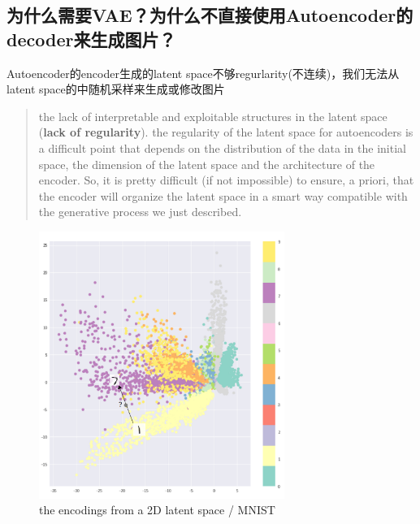 \subsection{为什么需要VAE？为什么不直接使用Autoencoder的decoder来生成图片？}

Autoencoder的encoder生成的latent space不够regurlarity(不连续)，我们无法从latent space的中随机采样来生成或修改图片
\begin{quotation}
    the lack of interpretable and exploitable structures in the latent space (\textbf{lack of regularity}).
    the regularity of the latent space for autoencoders is a difficult point that depends on the distribution of the data in the initial space, the dimension of the latent space and the architecture of the encoder. So, it is pretty difficult (if not impossible) to ensure, a priori, that the encoder will organize the latent space in a smart way compatible with the generative process we just described.
\end{quotation}
\begin{figure}[H]
    \centering
    \includegraphics[width=8cm]{images/mnist_ae_latent_space.png}
    \caption{the encodings from a 2D latent space / MNIST}
    \label{fig:mnist_ae_latent_space}
\end{figure}

